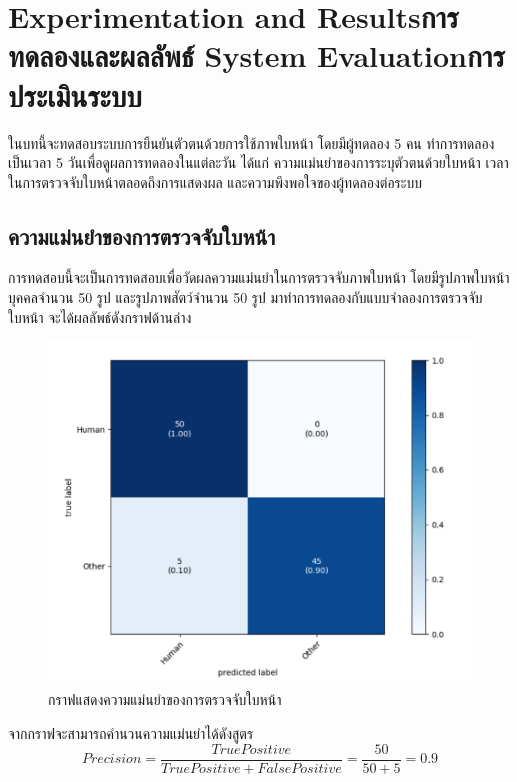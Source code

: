 \chapter{\ifproject%
\ifenglish Experimentation and Results\else การทดลองและผลลัพธ์\fi
\else%
\ifenglish System Evaluation\else การประเมินระบบ\fi
\fi}

ในบทนี้จะทดสอบระบบการยืนยันตัวตนด้วยการใช้ภาพใบหน้า โดยมีผู้ทดลอง 5 คน 
ทำการทดลองเป็นเวลา 5 วันเพื่อดูผลการทดลองในแต่ละวัน ได้แก่ ความแม่นยำของการระบุตัวตนด้วยใบหน้า 
เวลาในการตรวจจับใบหน้าตลอดถึงการแสดงผล และความพึงพอใจของผู้ทดลองต่อระบบ

\section{ความแม่นยำของการตรวจจับใบหน้า}
การทดสอบนี้จะเป็นการทดสอบเพื่อวัดผลความแม่นยำในการตรวจจับภาพใบหน้า โดยมีรูปภาพใบหน้าบุคคลจำนวน 50 รูป และรูปภาพสัตว์จำนวน 50 รูป 
มาทำการทดลองกับแบบจำลองการตรวจจับใบหน้า จะได้ผลลัพธ์ดังกราฟด้านล่าง

\begin{figure}[!ht]
  \begin{center}
    \includegraphics[scale=.45]{pic/face_result.png}
    \caption[กราฟแสดงความแม่นยำของการตรวจจับใบหน้า]{กราฟแสดงความแม่นยำของการตรวจจับใบหน้า}
    \label{fig:acc_graph}
  \end{center}
\end{figure}

\indent จากกราฟจะสามารถคำนวนความแม่นยำได้ดังสูตร 
\begin{equation}\label{eq:dielectric}
Precision=\frac{True Positive}{True Positive + False Positive}=\frac{50}{50+5} = 0.9
\end{equation}


